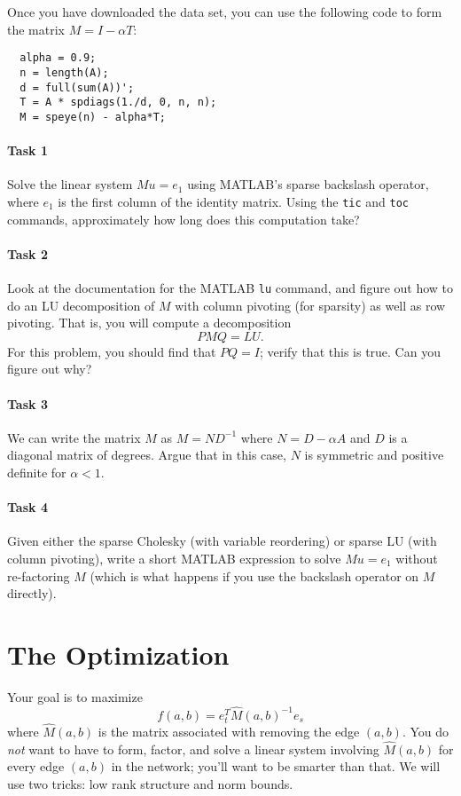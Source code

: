 \documentclass[12pt, leqno]{article}
\begin{document}
Once you have downloaded the data set, you can use the following code
to form the matrix $M = I-\alpha T$:
\begin{lstlisting}
  alpha = 0.9;
  n = length(A);
  d = full(sum(A))';
  T = A * spdiags(1./d, 0, n, n);
  M = speye(n) - alpha*T;  
\end{lstlisting}

\paragraph*{Task 1}
Solve the linear system $Mu = e_1$ using MATLAB's sparse backslash
operator, where $e_1$ is the first column of the identity matrix.
Using the {\tt tic} and {\tt toc} commands, approximately how long
does this computation take?

\paragraph*{Task 2}
Look at the documentation for the MATLAB {\tt lu} command, and figure
out how to do an LU decomposition of $M$ with column pivoting (for
sparsity) as well as row pivoting.  That is, you will compute a
decomposition
\[
  PMQ = LU.
\]
For this problem, you should find that $PQ = I$; verify that this is
true.  Can you figure out why?

\paragraph*{Task 3}
We can write the matrix $M$ as $M = N D^{-1}$ where $N = D-\alpha A$
and $D$ is a diagonal matrix of degrees.  Argue that in this case,
$N$ is symmetric and positive definite for $\alpha < 1$.

\paragraph*{Task 4}
Given either the sparse Cholesky (with variable reordering) or sparse
LU (with column pivoting), write a short MATLAB expression to solve
$Mu = e_1$ without re-factoring $M$ (which is what happens if you use
the backslash operator on $M$ directly).

\section*{The Optimization}

Your goal is to maximize
\[
  f(a,b) = e_t^T \hat{M}(a,b)^{-1} e_s
\]
where $\hat{M}(a,b)$ is the matrix associated with removing the edge
$(a,b)$.  You do {\em not} want to have to form, factor, and solve
a linear system involving $\hat{M}(a,b)$ for every edge $(a,b)$ in
the network; you'll want to be smarter than that.  We will use
two tricks: low rank structure and norm bounds.
\end{document}
